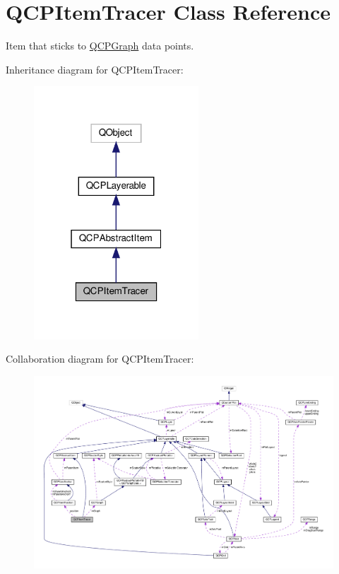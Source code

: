 \hypertarget{classQCPItemTracer}{}\section{Q\+C\+P\+Item\+Tracer Class Reference}
\label{classQCPItemTracer}


Item that sticks to \hyperlink{classQCPGraph}{Q\+C\+P\+Graph} data points.  




Inheritance diagram for Q\+C\+P\+Item\+Tracer\+:\nopagebreak
\begin{figure}[H]
\begin{center}
\leavevmode
\includegraphics[width=175pt]{classQCPItemTracer__inherit__graph}
\end{center}
\end{figure}


Collaboration diagram for Q\+C\+P\+Item\+Tracer\+:\nopagebreak
\begin{figure}[H]
\begin{center}
\leavevmode
\includegraphics[width=350pt]{classQCPItemTracer__coll__graph}
\end{center}
\end{figure}
